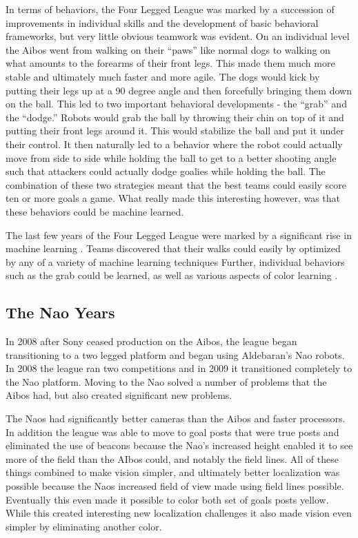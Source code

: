 \documentclass{llncs}
\begin{document}
In terms of behaviors, the Four Legged League was marked by a succession
of improvements in individual skills and the development of basic behavioral
frameworks, but very little obvious teamwork was evident. On an individual
level the Aibos went from walking on their ``paws'' like normal dogs to walking
on what amounts to the forearms of their front legs. This made them much
more stable and ultimately much faster and more agile.  The dogs would
kick by putting their legs up at a 90 degree angle and then forcefully bringing
them down on the ball. This led to two important behavioral developments - the
``grab'' and the ``dodge.'' Robots would grab the ball by throwing their
chin on top of it and putting their front legs around it. This would stabilize the
ball and put it under their control. It then naturally led to a behavior where
the robot could actually move from side to side while holding the ball to
get to a better shooting angle such that attackers could actually dodge
goalies while holding the ball. The combination of these two strategies meant
that the best teams could easily score ten or more goals a game. What really
made this interesting however, was that these behaviors could be machine
learned. 

The last few years of the Four Legged League were marked by a significant
rise in machine learning \cite{chalup-07}. Teams discovered that their walks could easily
by optimized by any of a variety of machine learning techniques \cite{kohl-04} \cite{chernova-04}
Further,
individual behaviors such as the grab \cite{fidelman-07} could be learned, as well as various
aspects of color learning \cite{quinlan-04}.

\subsection{The Nao Years}

In 2008 after Sony ceased production on the Aibos, the league began
transitioning to a two legged platform and began using Aldebaran's
Nao robots. In 2008 the league ran two competitions and in 2009 it transitioned
completely to the Nao platform. Moving to the Nao solved a number of
problems that the Aibos had, but also created significant new problems.

The Naos had significantly better cameras than the Aibos and faster
processors. In addition the league was able to move to goal posts
that were true posts and eliminated the use of beacons because the
Nao's increased height enabled it to see more of the field than the
AIbos could, and notably the field lines. All of these things combined
to make vision simpler, and ultimately better localization was possible because
the Naos increased field of view made using field lines possible. Eventually
this even made it possible to color both set of goals posts yellow. While
this created interesting new localization challenges it also made vision
even simpler by eliminating another color.
\end{document}
